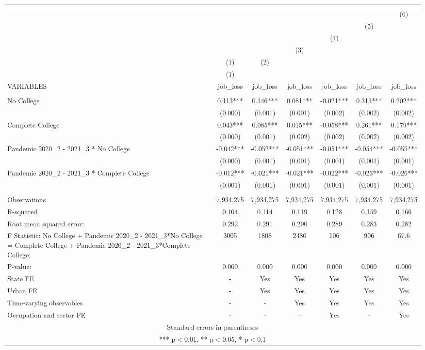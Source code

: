 \begin{tabular}{lcccccc}
\multicolumn{7}{c}{} \\ \hline
 &  &  &  &  &  & (6) \\
 &  &  &  &  & (5) &  \\
 &  &  &  & (4) &  &  \\
 &  &  & (3) &  &  &  \\
 & (1) & (2) &  &  &  &  \\
 & (1) &  &  &  &  &  \\
VARIABLES & job\_loss & job\_loss & job\_loss & job\_loss & job\_loss & job\_loss \\ \hline
 &  &  &  &  &  &  \\
No College & 0.113*** & 0.146*** & 0.081*** & -0.021*** & 0.313*** & 0.202*** \\
 & (0.000) & (0.001) & (0.001) & (0.002) & (0.002) & (0.002) \\
Complete College & 0.043*** & 0.085*** & 0.015*** & -0.058*** & 0.261*** & 0.179*** \\
 & (0.000) & (0.001) & (0.002) & (0.002) & (0.002) & (0.002) \\
Pandemic 2020\_2 - 2021\_3 * No College & -0.042*** & -0.052*** & -0.051*** & -0.051*** & -0.054*** & -0.055*** \\
 & (0.000) & (0.001) & (0.001) & (0.001) & (0.001) & (0.001) \\
Pandemic 2020\_2 - 2021\_3 * Complete College & -0.012*** & -0.021*** & -0.021*** & -0.022*** & -0.023*** & -0.026*** \\
 & (0.001) & (0.001) & (0.001) & (0.001) & (0.001) & (0.001) \\
 &  &  &  &  &  &  \\
Observations & 7,934,275 & 7,934,275 & 7,934,275 & 7,934,275 & 7,934,275 & 7,934,275 \\
R-squared & 0.104 & 0.114 & 0.119 & 0.128 & 0.159 & 0.166 \\
Root mean squared error: & 0.292 & 0.291 & 0.290 & 0.289 & 0.283 & 0.282 \\
F Statistic: No College + Pandemic 2020\_2 - 2021\_3*No College = Complete College + Pandemic 2020\_2 - 2021\_3*Complete College: & 3005 & 1808 & 2480 & 106 & 906 & 67.6 \\
\hspace{1mm} P-value: & 0.000 & 0.000 & 0.000 & 0.000 & 0.000 & 0.000 \\
State FE & - & Yes & Yes & Yes & Yes & Yes \\
Urban FE & - & Yes & Yes & Yes & Yes & Yes \\
Time-varying observables & - & - & Yes & Yes & Yes & Yes \\
 Occupation and sector FE & - & - & - & Yes & - & Yes \\ \hline
\multicolumn{7}{c}{ Standard errors in parentheses} \\
\multicolumn{7}{c}{ *** p$<$0.01, ** p$<$0.05, * p$<$0.1} \\
\end{tabular}
